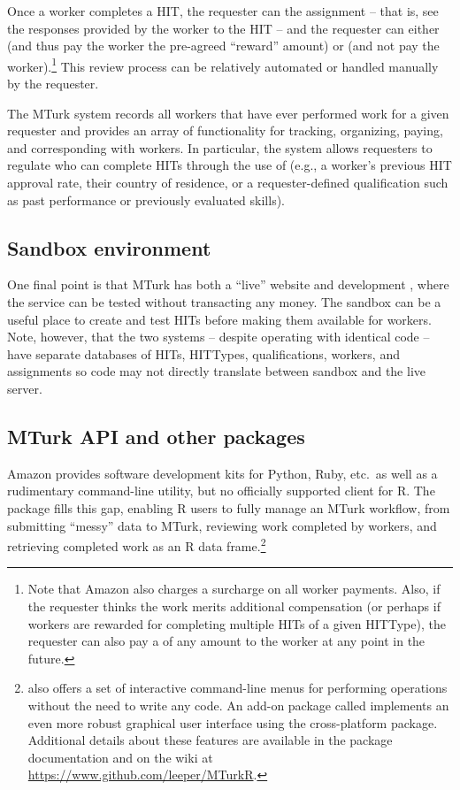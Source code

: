 Once a worker completes a HIT, the requester can  the
assignment -- that is, see the responses provided by the worker to the
HIT -- and the requester can either  (and thus pay the
worker the pre-agreed ``reward'' amount) or  (and not pay
the worker).\footnote{Note that Amazon also charges a surcharge on all
  worker payments. Also, if the requester thinks the work merits
  additional compensation (or perhaps if workers are rewarded for
  completing multiple HITs of a given HITType), the requester can also
  pay a  of any amount to the worker at any point in the
  future.} This review process can be relatively automated or handled
manually by the requester.

The MTurk system records all workers that have ever performed work for
a given requester and provides an array of functionality for tracking,
organizing, paying, and corresponding with workers. In particular, the
system allows requesters to regulate who can complete HITs through the
use of  (e.g., a worker's previous HIT
approval rate, their country of residence, or a requester-defined
qualification such as past performance or previously evaluated skills).

\subsection{Sandbox environment}
One final point is that MTurk has both a ``live'' website and development , where the service can be tested without transacting any money. The sandbox can be a useful place to create and test HITs before making them available for workers. Note, however, that the two systems -- despite operating with identical code -- have separate databases of HITs, HITTypes, qualifications, workers, and assignments so code may not directly translate between sandbox and the live server.

\subsection{MTurk API and other packages}
Amazon provides software development kits for Python, Ruby, etc.\ as
well as a rudimentary command-line utility, but no officially
supported client for R. The  package fills
this gap, enabling R users to fully manage an MTurk workflow, from
submitting ``messy'' data to MTurk, reviewing work completed by
workers, and retrieving completed work as an R
data frame.\footnote{ also offers a set of
  interactive command-line menus for performing 
  operations without the need to write any code. An add-on package
  called  \citep{mturkrgui} implements an even more
  robust graphical user interface using the cross-platform
   package. Additional details about these  features are
  available in the package documentation and on the  wiki at
  \url{https://www.github.com/leeper/MTurkR}.}

